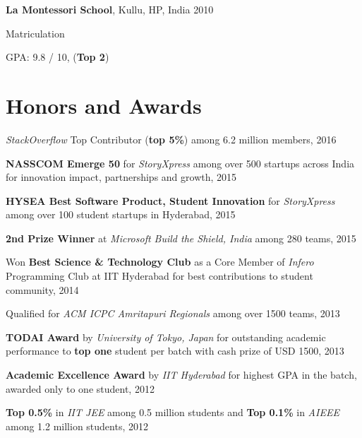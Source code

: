 \documentclass[margin,line]{res}
\newenvironment{list1}{
  \begin{list}{\ding{113}}{%
    \setlength{\itemsep}{0in}
    \setlength{\parsep}{0in} \setlength{\parskip}{0in}
    \setlength{\topsep}{0in} \setlength{\partopsep}{0in}
    \setlength{\leftmargin}{0.17in}}}{\end{list}}
\begin{document}
\begin{resume}
  \vspace*{-2.5mm}

  {\bf La Montessori School}, Kullu, HP, India \hfill 2010 \\
  \vspace*{-.1in}
  \begin{list1}
	\item[] Matriculation
	\item[] GPA: 9.8 / 10, ({\bf Top 2})
  \end{list1}


\section{\sc Honors and Awards}
  {\it StackOverflow} Top Contributor ({\bf top 5\%}) among 6.2 million members, 2016

  \vspace*{-2.5mm}
  {\bf NASSCOM Emerge 50} for {\it StoryXpress} among over 500 startups across India for innovation impact, partnerships and growth, 2015

  \vspace*{-2.5mm}
  {\bf HYSEA Best Software Product, Student Innovation} for {\it StoryXpress} among over 100 student startups in Hyderabad, 2015

  \vspace*{-2.5mm}
  {\bf 2nd Prize Winner} at {\it Microsoft Build the Shield, India} among 280 teams, 2015

  \vspace*{-2.5mm}
  Won {\bf Best Science \& Technology Club} as a Core Member of {\it Infero} Programming Club at IIT Hyderabad for best contributions to student community, 2014

  \vspace*{-2.5mm}
  Qualified for {\it ACM ICPC Amritapuri Regionals} among over 1500 teams, 2013

  \vspace*{-2.5mm}
  {\bf TODAI Award} by {\it University of Tokyo, Japan} for outstanding academic performance to {\bf top one} student per batch with cash prize of USD 1500, 2013

  \vspace*{-2.5mm}
  {\bf Academic Excellence Award} by {\it IIT Hyderabad} for highest GPA in the batch, awarded only to one student, 2012

  \vspace*{-2.5mm}
  {\bf Top 0.5\%} in {\it IIT JEE} among 0.5 million students and {\bf Top 0.1\%} in {\it AIEEE} among 1.2 million students, 2012


\end{resume}
\end{document}
